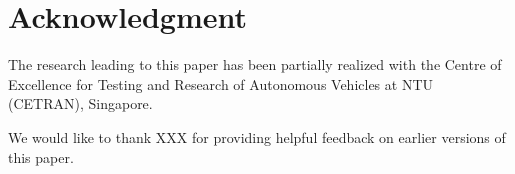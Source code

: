 \section*{Acknowledgment}

The research leading to this paper has been partially realized with the Centre of Excellence for Testing and Research of Autonomous Vehicles at NTU (CETRAN), Singapore. 

\color{red}
We would like to thank XXX for providing helpful feedback on earlier versions of this paper.
\color{black}
